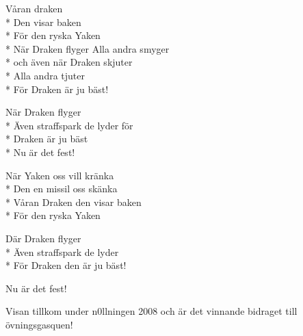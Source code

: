 \begin{SongText}
    \begin{SongVerse}
        Våran draken\\*%
        Den visar baken\\*%
        För den ryska Yaken\\*%
        När Draken flyger Alla andra smyger\\*%
        och även när Draken skjuter\\*%
        Alla andra tjuter\\*%
        För Draken är ju bäst!
    \end{SongVerse}
    \begin{SongVerse}
        När Draken flyger\\*%
        Även straffspark de lyder för\\*%
        Draken är ju bäst\\*%
        Nu är det fest!
    \end{SongVerse}
    \begin{SongVerse}
        När Yaken oss vill kränka\\*%
        Den en missil oss skänka\\*%
        Våran Draken den visar baken\\*%
        För den ryska Yaken
    \end{SongVerse}
    \begin{SongVerse}
        Där Draken flyger\\*%
        Även straffspark de lyder\\*%
        För Draken den är ju bäst!
    \end{SongVerse}
    \begin{SongVerse}
        Nu är det fest!
    \end{SongVerse}
    \begin{SongInfo}
        Visan tillkom under n0llningen 2008 och är det vinnande bidraget till övningsgasquen!
    \end{SongInfo}
\end{SongText}

